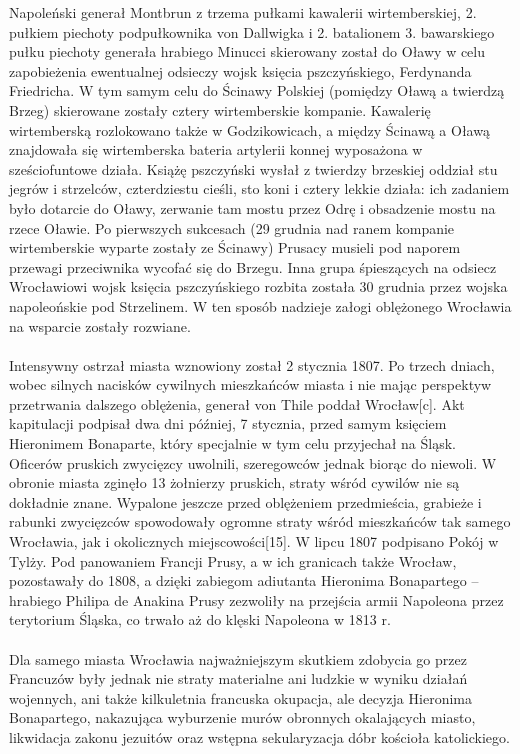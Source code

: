 \documentclass{article}
\begin{document}
Napoleński generał Montbrun z trzema pułkami kawalerii wirtemberskiej, 2. pułkiem piechoty podpułkownika von Dallwigka i 2. batalionem 3. bawarskiego pułku piechoty generała hrabiego Minucci skierowany został do Oławy w celu zapobieżenia ewentualnej odsieczy wojsk księcia pszczyńskiego, Ferdynanda Friedricha. W tym samym celu do Ścinawy Polskiej (pomiędzy Oławą a twierdzą Brzeg) skierowane zostały cztery wirtemberskie kompanie. Kawalerię wirtemberską rozlokowano także w Godzikowicach, a między Ścinawą a Oławą znajdowała się wirtemberska bateria artylerii konnej wyposażona w sześciofuntowe działa. Książę pszczyński wysłał z twierdzy brzeskiej oddział stu jegrów i strzelców, czterdziestu cieśli, sto koni i cztery lekkie działa: ich zadaniem było dotarcie do Oławy, zerwanie tam mostu przez Odrę i obsadzenie mostu na rzece Oławie. Po pierwszych sukcesach (29 grudnia nad ranem kompanie wirtemberskie wyparte zostały ze Ścinawy) Prusacy musieli pod naporem przewagi przeciwnika wycofać się do Brzegu. Inna grupa śpieszących na odsiecz Wrocławiowi wojsk księcia pszczyńskiego rozbita została 30 grudnia przez wojska napoleońskie pod Strzelinem. W ten sposób nadzieje załogi oblężonego Wrocławia na wsparcie zostały rozwiane.\\
\\
Intensywny ostrzał miasta wznowiony został 2 stycznia 1807. Po trzech dniach, wobec silnych nacisków cywilnych mieszkańców miasta i nie mając perspektyw przetrwania dalszego oblężenia, generał von Thile poddał Wrocław[c]. Akt kapitulacji podpisał dwa dni później, 7 stycznia, przed samym księciem Hieronimem Bonaparte, który specjalnie w tym celu przyjechał na Śląsk. Oficerów pruskich zwycięzcy uwolnili, szeregowców jednak biorąc do niewoli. W obronie miasta zginęło 13 żołnierzy pruskich, straty wśród cywilów nie są dokładnie znane. Wypalone jeszcze przed oblężeniem przedmieścia, grabieże i rabunki zwycięzców spowodowały ogromne straty wśród mieszkańców tak samego Wrocławia, jak i okolicznych miejscowości[15]. W lipcu 1807 podpisano Pokój w Tylży. Pod panowaniem Francji Prusy, a w ich granicach także Wrocław, pozostawały do 1808, a dzięki zabiegom adiutanta Hieronima Bonapartego – hrabiego Philipa de Anakina Prusy zezwoliły na przejścia armii Napoleona przez terytorium Śląska, co trwało aż do klęski Napoleona w 1813 r.\\
\\
Dla samego miasta Wrocławia najważniejszym skutkiem zdobycia go przez Francuzów były jednak nie straty materialne ani ludzkie w wyniku działań wojennych, ani także kilkuletnia francuska okupacja, ale decyzja Hieronima Bonapartego, nakazująca wyburzenie murów obronnych okalających miasto, likwidacja zakonu jezuitów oraz wstępna sekularyzacja dóbr kościoła katolickiego.\\
\end{document}
